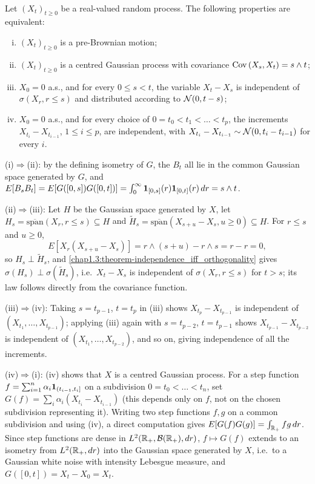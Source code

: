 \begin{proposition}[Characterisations] \label{chap2.1:proposition-characterisations_of_brownian_motion}  \\
Let $(X_t)_{t\ge0}$ be a real-valued random process. The following properties are equivalent:
\begin{enumerate}[(i)]
    \item $(X_t)_{t\ge0}$ is a pre-Brownian motion;
    \item $(X_t)_{t\ge0}$ is a centred Gaussian process with covariance $\operatorname{Cov}\left(X_s, X_t\right)=s\wedge t$;
    \item $X_0=0$ a.s., and for every $0\le s<t$, the variable $X_t-X_s$ is independent of $\sigma(X_r,r\le s)$ and distributed according to $\mathcal{N}(0,t-s)$;
    \item $X_0=0$ a.s., and for every choice of $0=t_0<t_1<\dots<t_p$, the increments $X_{t_i}-X_{t_{i-1}}$, $1\le i\le p$, are independent, with $X_{t_i}-X_{t_{i-1}}\sim\mathcal{N}(0,t_i-t_{i-1})$ for every $i$.
\end{enumerate}
\end{proposition}
\begin{proofidea}
(i)$\Rightarrow$(ii): by the defining isometry of $G$, the $B_t$ all lie in the common Gaussian space generated by $G$, and $E[B_sB_t]=E[G([0,s])G([0,t])]=\int_0^\infty\mathbf{1}_{[0,s]}(r)\mathbf{1}_{[0,t]}(r)\,dr=s\wedge t$.

(ii)$\Rightarrow$(iii): Let $H$ be the Gaussian space generated by $X$, let $H_s=\overline{\mathrm{span}}(X_r,r\le s)\subseteq H$ and $\tilde H_s=\overline{\mathrm{span}}(X_{s+u}-X_s,u\ge0)\subseteq H$. For $r\le s$ and $u\ge0$,
$$E[X_r(X_{s+u}-X_s)]=r\wedge(s+u)-r\wedge s=r-r=0,$$
so $H_s\perp\tilde H_s$, and \cref{chap1.3:theorem-independence_iff_orthogonality} gives $\sigma(H_s)\perp\sigma(\tilde H_s)$, i.e.\ $X_t-X_s$ is independent of $\sigma(X_r,r\le s)$ for $t>s$; its law follows directly from the covariance function.

(iii)$\Rightarrow$(iv): Taking $s=t_{p-1}$, $t=t_p$ in (iii) shows $X_{t_p}-X_{t_{p-1}}$ is independent of $(X_{t_1},\dots,X_{t_{p-1}})$; applying (iii) again with $s=t_{p-2}$, $t=t_{p-1}$ shows $X_{t_{p-1}}-X_{t_{p-2}}$ is independent of $(X_{t_1},\dots,X_{t_{p-2}})$, and so on, giving independence of all the increments.

(iv)$\Rightarrow$(i): (iv) shows that $X$ is a centred Gaussian process. For a step function $f=\sum_{i=1}^n\alpha_i\mathbf{1}_{(t_{i-1},t_i]}$ on a subdivision $0=t_0<\dots<t_n$, set $G(f)=\sum_i\alpha_i(X_{t_i}-X_{t_{i-1}})$ (this depends only on $f$, not on the chosen subdivision representing it). Writing two step functions $f,g$ on a common subdivision and using (iv), a direct computation gives $E[G(f)G(g)]=\int_{\mathbb{R}_+}fg\,dr$. Since step functions are dense in $L^2(\mathbb{R}_+,\mathcal B(\mathbb{R}_+),dr)$, $f\mapsto G(f)$ extends to an isometry from $L^2(\mathbb{R}_+,dr)$ into the Gaussian space generated by $X$, i.e.\ to a Gaussian white noise with intensity Lebesgue measure, and $G([0,t])=X_t-X_0=X_t$.
\end{proofidea}

